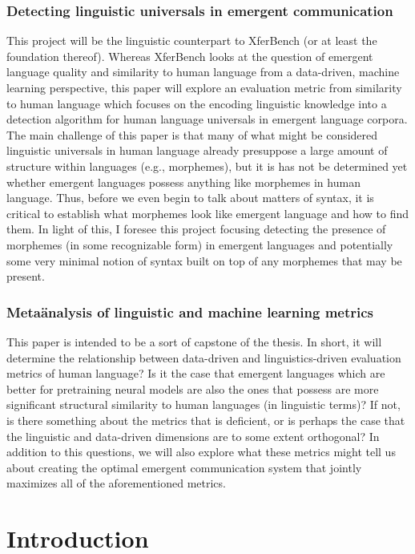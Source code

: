 \subsection{Detecting linguistic universals in emergent communication}
This project will be the linguistic counterpart to XferBench (or at least the foundation thereof).
Whereas XferBench looks at the question of emergent language quality and similarity to human language from a data-driven, machine learning perspective, this paper will explore an evaluation metric from similarity to human language which focuses on the encoding linguistic knowledge into a detection algorithm for human language universals in emergent language corpora.
The main challenge of this paper is that many of what might be considered linguistic universals in human language already presuppose a large amount of structure within languages (e.g., morphemes), but it is has not be determined yet whether emergent languages possess anything like morphemes in human language.
Thus, before we even begin to talk about matters of syntax, it is critical to establish what morphemes look like emergent language and how to find them.
In light of this, I foresee this project focusing detecting the presence of morphemes (in some recognizable form) in emergent languages and potentially some very minimal notion of syntax built on top of any morphemes that may be present.


\subsection{Meta\"analysis of linguistic and machine learning metrics}
This paper is intended to be a sort of capstone of the thesis.
In short, it will determine the relationship between data-driven and linguistics-driven evaluation metrics of human language?
Is it the case that emergent languages which are better for pretraining neural models are also the ones that possess are more significant structural similarity to human languages (in linguistic terms)?
If not, is there something about the metrics that is deficient, or is perhaps the case that the linguistic and data-driven dimensions are to some extent orthogonal?
In addition to this questions, we will also explore what these metrics might tell us about creating the optimal emergent communication system that jointly maximizes all of the aforementioned metrics.




\chapter{Introduction}

